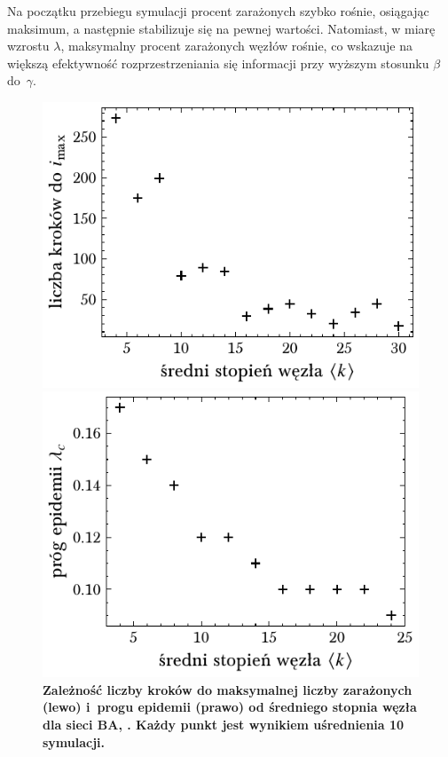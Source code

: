 \documentclass[13pt,a4paper]{article}
\begin{document}
Na początku przebiegu symulacji procent zarażonych szybko rośnie, osiągając maksimum, a następnie stabilizuje się na pewnej wartości. Natomiast, w miarę wzrostu $\lambda$, maksymalny procent zarażonych węzłów rośnie, co wskazuje na większą efektywność rozprzestrzeniania się informacji przy wyższym stosunku $\beta$ do $\gamma$.

\pagebreak

\begin{figure}[ht!]
	\begin{minipage}[t]{0.49\textwidth}
		\centering
		\includegraphics[width=\textwidth]{../figures/none/ba_tmax_vs_k.pdf}
	\end{minipage}
	\hspace{\fill}
	\begin{minipage}[t]{0.49\textwidth}
		\centering
		\includegraphics[width=\textwidth]{../figures/none/ba_threshold_vs_k.pdf}
	\end{minipage}
	\caption{\centering\textbf{Zależność liczby kroków do maksymalnej liczby zarażonych (lewo) i progu epidemii (prawo) od średniego stopnia węzła dla sieci BA, . Każdy punkt jest wynikiem uśrednienia 10 symulacji.}}
\end{figure}
\end{document}
